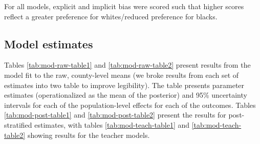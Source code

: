 \documentclass[]{article}
\theoremstyle{definition}
\theoremstyle{definition}
\theoremstyle{remark}
\begin{document}
For all models, explicit and implicit bias were scored such that higher
scores reflect a greater preference for whites/reduced preference for
blacks.

\subsection{Model estimates}\label{model-estimates}

Tables \ref{tab:mod-raw-table1} and \ref{tab:mod-raw-table2} present
results from the model fit to the raw, county-level means (we broke
results from each set of estimates into two table to improve
legibility). The table presents parameter estimates (operationalized as
the mean of the posterior) and 95\% uncertainty intervals for each of
the population-level effects for each of the outcomes. Tables
\ref{tab:mod-post-table1} and \ref{tab:mod-post-table2} present the
results for post-stratified estimates, with tables
\ref{tab:mod-teach-table1} and \ref{tab:mod-teach-table2} showing
results for the teacher models.
\end{document}
